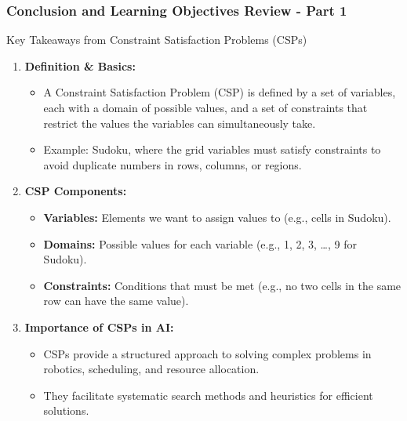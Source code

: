 \documentclass[aspectratio=169]{beamer}
\begin{document}
\begin{frame}[fragile]
    \frametitle{Conclusion and Learning Objectives Review - Part 1}
    \begin{block}{Key Takeaways from Constraint Satisfaction Problems (CSPs)}
        \begin{enumerate}
            \item \textbf{Definition \& Basics:}
            \begin{itemize}
                \item A Constraint Satisfaction Problem (CSP) is defined by a set of variables, each with a domain of possible values, and a set of constraints that restrict the values the variables can simultaneously take.
                \item Example: Sudoku, where the grid variables must satisfy constraints to avoid duplicate numbers in rows, columns, or regions.
            \end{itemize}

            \item \textbf{CSP Components:}
            \begin{itemize}
                \item \textbf{Variables:} Elements we want to assign values to (e.g., cells in Sudoku).
                \item \textbf{Domains:} Possible values for each variable (e.g., {1, 2, 3, \ldots, 9} for Sudoku).
                \item \textbf{Constraints:} Conditions that must be met (e.g., no two cells in the same row can have the same value).
            \end{itemize}

            \item \textbf{Importance of CSPs in AI:}
            \begin{itemize}
                \item CSPs provide a structured approach to solving complex problems in robotics, scheduling, and resource allocation.
                \item They facilitate systematic search methods and heuristics for efficient solutions.
            \end{itemize}
        \end{enumerate}
    \end{block}
\end{frame}
\end{document}
